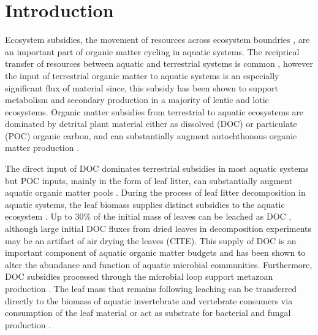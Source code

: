 \section{Introduction}
Ecosystem subsidies, the movement of resources across ecosystem boundries \cite{Polis_1997}, are an important part of organic matter cycling in aquatic systems. The reciprical transfer of resources between aquatic and terrestrial systems is common \cite{Nakano_2001}, however the input of terrestrial organic matter to aquatic systems is an especially significant flux of material since, this subsidy has been shown to support metabolism and secondary production in a majority of lentic and lotic ecosystems\cite{Marcarelli_2011}. Organic matter subsidies from terrestrial to aquatic ecosystems are dominated by detrital plant material either as dissolved (DOC) or particulate (POC) organic carbon, and can substantially augment autochthonous organic matter production \cite{Hodkinson_1975,GASITH_1976,wetzel_1984,WETZEL_1995,Webster_1997,Kobayashi_2011,Mehring_2014}.   

The direct input of DOC dominates terrestrial subsidies in most aquatic systems \cite{Rich_1978,wetzel_1984,CITE} but POC inputs, mainly in the form of leaf litter, can substantially augment aquatic organic matter pools \cite{Wetzel_1972,Hodkinson_1975,GASITH_1976,Rich_1978,Wallace_1999,Mehring_2014}. During the process of leaf litter decomposition in aquatic systems, the leaf biomass supplies distinct subsidies to the aquatic ecosystem \cite{Gessner_1999,Marcarelli_2011}. Up to 30\% of the initial mass of leaves can be leached as DOC \cite{CITE,Meyer_1998,Duan_2014}, although large initial DOC fluxes from dried leaves in decomposition experiments may be an artifact of air drying the leaves (CITE). This supply of DOC is an important component of aquatic organic matter budgets \cite{McDowell_1976,Karlsson_2007} and has been shown to alter the abundance \cite{Bott_1984,Fey_2015} and function \cite{MCCONNELL_1968,Lennon_2005} of aquatic microbial communities. Furthermore, DOC subsidies processed through the microbial loop support metazoan production \cite{Hall_1998,Wilcox_2005,Fey_2015b}.  The leaf mass that remains following leaching can be transferred directly to the biomass of aquatic invertebrate \cite{Wallace_1999,Kobayashi_2011} and vertebrate \cite{Rubbo_2008} consumers via consumption of the leaf material or act as substrate for bacterial and fungal production \cite{Gessner_1999}. 

